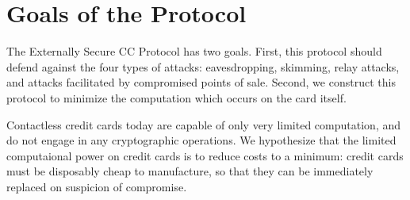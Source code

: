 \section{Goals of the Protocol}
\label{sec:external-goals}

The Externally Secure CC Protocol has two goals.
First, this protocol should defend against the four types of attacks:
    eavesdropping, skimming, relay attacks, and attacks facilitated by compromised points of sale.
Second, we construct this protocol to minimize the computation which occurs on the card itself.

Contactless credit cards today are capable of only very limited computation, and do not engage in any cryptographic operations.
We hypothesize that the limited computaional power on credit cards is to reduce costs to a minimum:
	credit cards must be disposably cheap to manufacture, so that they can be immediately replaced on suspicion of compromise.
